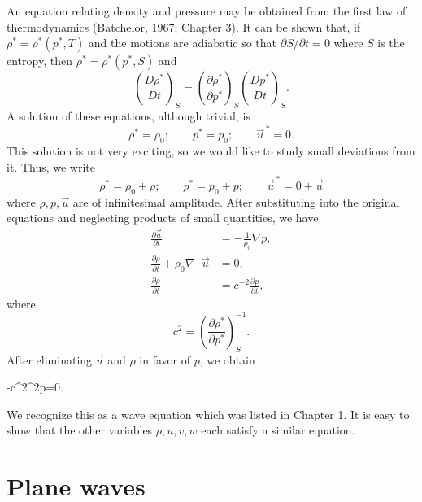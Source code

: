 An equation relating density and pressure may be obtained from the first law of
thermodynamics (Batchelor, 1967; Chapter 3). It can be shown that, if
$\rho^*=\rho^*(p^*,T)$ and the motions are adiabatic so that $\partial S/\partial t=0$ where $S$ is
the entropy, then $\rho^*=\rho^*(p^*,S)$ and
\[
	\left(\frac{D\rho^*}{Dt}\right)_S
	=\left(\frac{\partial\rho^*}{\partial p^*}\right)_S
	\left(\frac{Dp^*}{Dt}\right)_S.
\]
A solution of these equations, although trivial, is
\[
	\rho^*=\rho_0;\qquad p^*=p_0;\qquad \vec u^{\,*}=0.
\]
This solution is not very exciting, so we would like to study small deviations from it.
Thus, we write
\[
	\rho^*=\rho_0+\rho;\qquad
	p^*=p_0+p;\qquad
	\vec u^{\,*}=0+\vec u
\]
where $\rho,p,\vec u$ are of infinitesimal amplitude. After substituting into the original
equations and neglecting products of small quantities, we have
\begin{align*}
	\frac{\partial\vec u}{\partial t}                       & =-\frac{1}{\rho_0}\nabla p,           \\
	\frac{\partial\rho}{\partial t}+\rho_0\nabla\cdot\vec u & =0,                                   \\
	\frac{\partial\rho}{\partial t}                         & =c^{-2}\frac{\partial p}{\partial t},
\end{align*}
where
\[
	c^2=\left(\frac{\partial\rho^*}{\partial p^*}\right)_S^{-1}.
\]
After eliminating $\vec u$ and $\rho$ in favor of $p$, we obtain
\begin{waveequation}
	-c^2\nabla^2p=0.
\end{waveequation}
We recognize this as a wave equation which was listed in Chapter 1. It is easy to show
that the other variables $\rho,u,v,w$ each satisfy a similar equation.

\sourcepagebreak

\section{Plane waves}

